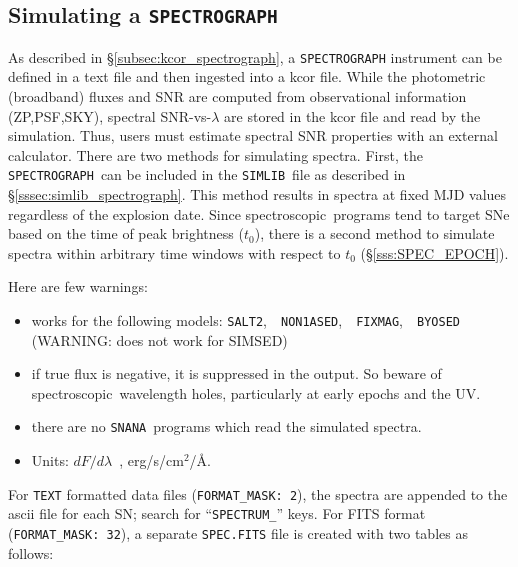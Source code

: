 \documentclass[12pt]{article}
\newcommand{\SPEC}{{\tt SPECTROGRAPH}}
\newcommand{\Flam}{dF/d\lambda}
\newcommand{\snana}{{\tt SNANA}}
\newcommand{\simlib}{{\tt SIMLIB}}
\newcommand{\spec}{spectroscopic}
\begin{document}
  \clearpage
   \subsection{Simulating a {\SPEC} }
   \label{subsec:sim_spec}

As described in \S\ref{subsec:kcor_spectrograph}, 
a {\SPEC} instrument can be defined in a text file
and then ingested into a kcor file.
While the photometric (broadband) fluxes and SNR are computed 
from observational information (ZP,PSF,SKY), 
spectral SNR-vs-$\lambda$ are stored in the kcor file and 
read by the simulation.
Thus, users must estimate spectral SNR properties with an 
external calculator. There are two methods for simulating spectra.
First, the \SPEC\ can be included in the \simlib\ file
as described in \S\ref{sssec:simlib_spectrograph}.
This method results in spectra at fixed MJD values
regardless of the explosion date. Since \spec\ programs
tend to target SNe based on the time of peak brightness ($t_0$),
there is a second method to simulate spectra within arbitrary 
time windows with respect to $t_0$ (\S\ref{sss:SPEC_EPOCH}).


\medskip
Here are few warnings:
\begin{itemize}
  \item works for the following models: 
       {\tt SALT2},~~{\tt NON1ASED},~~{\tt FIXMAG},~~{\tt BYOSED} \\
         (WARNING: does not work for SIMSED)
  \item if true flux is negative, it is suppressed in the output. 
        So beware of \spec\ wavelength holes, 
        particularly at early epochs and the UV.
  \item there are no \snana\ programs which read the simulated spectra.
  \item Units: $\Flam$~, erg/s/cm$^2$/\AA.
\end{itemize}

\medskip
For {\tt TEXT} formatted data files ({\tt FORMAT\_MASK: 2}),
the spectra are appended to the ascii file for each SN; 
search for ``{\tt SPECTRUM\_}'' keys.
For FITS format ({\tt FORMAT\_MASK: 32}), 
a separate {\tt *SPEC.FITS} file is created
with two tables as follows:
\end{document}
